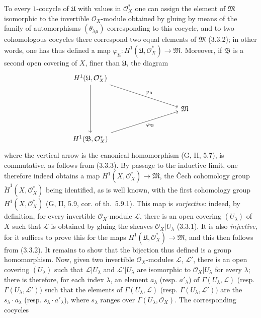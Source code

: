 \begin{env}[5.4.7]
To every $1$-cocycle of $\mathfrak{U}$ with values
in $\mathcal{O}_X^*$ one can assign the element of $\mathfrak{M}$ isomorphic to the
invertible $\mathcal{O}_X$-module obtained by gluing by means of the
family of automorphisms $(\theta_{\lambda\mu})$ corresponding to this cocycle,
and to two cohomologous cocycles there correspond two equal elements of
$\mathfrak{M}$ (3.3.2); in other words, one has thus defined a map
$\varphi_{\mathfrak{U}}:H^1(\mathfrak{U},\mathcal{O}_X^*)\to\mathfrak{M}$.
Moreover, if $\mathfrak{B}$ is a second open covering of $X$, finer
than $\mathfrak{U}$, the diagram
\[
\begin{tikzcd}[column sep=huge,row sep=large]
H^1(\mathfrak{U},\mathcal{O}_X^*)
  \arrow[dd]
  \arrow[rrd,"\varphi_{\mathfrak{U}}"] & & \\
& & \mathfrak{M} \\
H^1(\mathfrak{B},\mathcal{O}_X^*)
  \arrow[rru,swap,"\varphi_{\mathfrak{B}}"] & &
\end{tikzcd}
\]
where the vertical arrow is the canonical homomorphism (G, II, 5.7), is
commutative, as follows from (3.3.3). By passage to the inductive limit, one
therefore indeed obtains a map
$H^1(X,\mathcal{O}_X^*)\to\mathfrak{M}$, the \v{C}ech cohomology group
$\check{H}^1(X,\mathcal{O}_X^*)$ being identified, as is well known, with the first
cohomology group $H^1(X,\mathcal{O}_X^*)$ (G, II, 5.9, cor. of th.~5.9.1).
This map is \emph{surjective}: indeed, by definition, for every invertible
$\mathcal{O}_X$-module $\mathcal{L}$, there is an open covering
$(U_\lambda)$ of $X$ such that $\mathcal{L}$ is obtained by gluing the
sheaves $\mathcal{O}_X|U_\lambda$ (3.3.1). It is also
\emph{injective}, for it suffices to prove this for the maps
$H^1(\mathfrak{U},\mathcal{O}_X^*)\to\mathfrak{M}$, and this then follows from
(3.3.2). It remains to show that
the bijection thus defined is a group homomorphism. Now, given
two invertible $\mathcal{O}_X$-modules $\mathcal{L}$, $\mathcal{L}'$, there is
an open covering $(U_\lambda)$ such that $\mathcal{L}|U_\lambda$ and
$\mathcal{L}'|U_\lambda$ are isomorphic to $\mathcal{O}_X|U_\lambda$ for
every $\lambda$; there is therefore, for each index $\lambda$, an element
$a_\lambda$ (resp. $a'_\lambda$) of $\Gamma(U_\lambda,\mathcal{L})$ (resp.
$\Gamma(U_\lambda,\mathcal{L}'))$ such that the elements of
$\Gamma(U_\lambda,\mathcal{L})$ (resp. $\Gamma(U_\lambda,\mathcal{L}'))$
are the $s_\lambda\cdot a_\lambda$ (resp.
$s_\lambda\cdot a'_\lambda$), where $s_\lambda$ ranges over
$\Gamma(U_\lambda,\mathcal{O}_X)$. The corresponding cocycles

\end{env}
